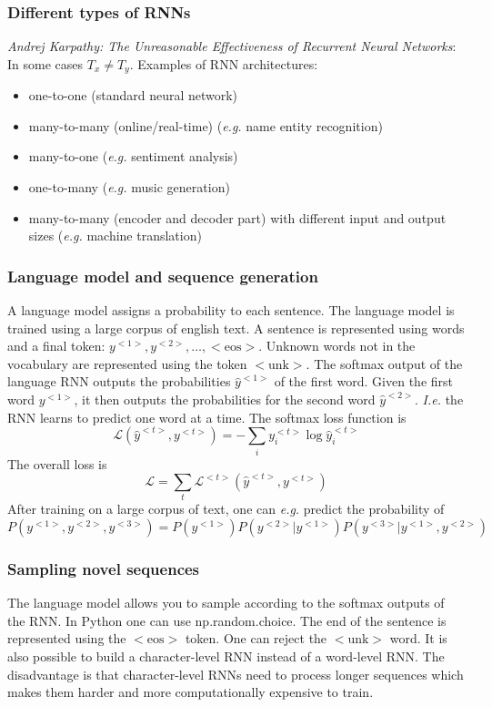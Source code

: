 \documentclass{article}
\begin{document}
\subsubsection{Different types of RNNs}
\emph{Andrej Karpathy: The Unreasonable Effectiveness of Recurrent Neural Networks}:
In some cases $T_x\neq T_y$.
Examples of RNN architectures:
\begin{itemize}
  \item one-to-one (standard neural network)
  \item many-to-many (online/real-time) (\emph{e.g.} name entity recognition)
  \item many-to-one (\emph{e.g.} sentiment analysis)
  \item one-to-many (\emph{e.g.} music generation)
  \item many-to-many (encoder and decoder part) with different input and output sizes (\emph{e.g.} machine translation)
\end{itemize}

\subsubsection{Language model and sequence generation}
A language model assigns a probability to each sentence.
The language model is trained using a large corpus of english text.
A sentence is represented using words and a final token: $y^{<1>}, y^{<2>},\ldots,\mathrm{<eos>}$.
Unknown words not in the vocabulary are represented using the token $\mathrm{<unk>}$.
The softmax output of the language RNN outputs the probabilities $\hat{y}^{<1>}$ of the first word.
Given the first word $y^{<1>}$, it then outputs the probabilities for the second word $\hat{y}^{<2>}$.
\emph{I.e.} the RNN learns to predict one word at a time.
The softmax loss function is
\begin{equation}
  \mathcal{L}(\hat{y}^{<t>},y^{<t>})=-\sum_i y^{<t>}_i \log \hat{y}^{<t>}_i
\end{equation}
The overall loss is
\begin{equation}
  \mathcal{L}=\sum_t\mathcal{L}^{<t>}(\hat{y}^{<t>},y^{<t>})
\end{equation}
After training on a large corpus of text,
one can \emph{e.g.} predict the probability of
\begin{equation}
  P(y^{<1>},y^{<2>},y^{<3>})=P(y^{<1>})P(y^{<2>}|y^{<1>})P(y^{<3>}|y^{<1>},y^{<2>})
\end{equation}

\subsubsection{Sampling novel sequences}
The language model allows you to sample according to the softmax outputs of the RNN.
In Python one can use np.random.choice.
The end of the sentence is represented using the $\mathrm{<eos>}$ token.
One can reject the $\mathrm{<unk>}$ word.
It is also possible to build a character-level RNN instead of a word-level RNN.
The disadvantage is that character-level RNNs need to process longer sequences which makes them harder and more computationally expensive to train.
\end{document}
